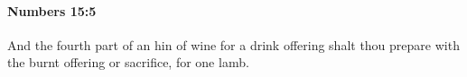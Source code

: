 
		\paragraph{Numbers 15:5} %
			\label{NUMBERS-15-5}

			And the fourth part of an hin of wine for a drink offering shalt thou prepare with the burnt offering or sacrifice, for one lamb.


